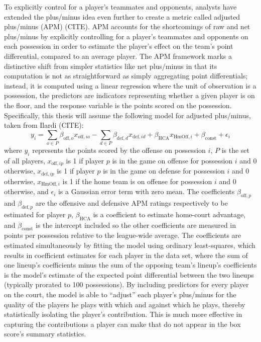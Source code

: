 To explicitly control for a player's teammates and opponents, analysts have extended
the plus/minus idea even further to create a metric called adjusted plus/minus (APM)
(CITE). APM accounts for the shortcomings of raw and net plus/minus by explicitly
controlling for a player's teammates and opponents on each possession in order to
estimate the player's effect on the team's point differential, compared to an
average player. The APM framework marks a distinctive shift from simpler statistics
like net plus/minus in that its computation is not as straightforward as simply
aggregating point differentials; instead, it is computed using a linear regression
where the unit of observation is a possession, the predictors are indicators
representing whether a given player is on the floor, and the response variable is
the points scored on the possession. Specifically, this thesis will assume the
following model for adjusted plus/minus, taken from Ilardi (CITE):
\begin{equation} \label{eq:apm}
    y_i = \sum_{o \in P} \beta_{\text{off},o} x_{\text{off},io} -
    \sum_{d \in P} \beta_{\text{def},d} x_{\text{def},id} + \beta_{\text{HCA}}
    x_{\text{HmOff},i} + \beta_{\text{const}} + \epsilon_i
\end{equation}
where $y_i$ represents the points scored by the offense on possession $i$, $P$ is
the set of all players, $x_{\text{off},ip}$ is 1 if player $p$ is in the game
on offense for possession $i$ and 0 otherwise, $x_{\text{def},ip}$ is 1 if player
$p$ is in the game on defense for possession $i$ and 0 otherwise,
$x_{\text{HmOff},i}$ is 1 if the home team is on offense for possession $i$ and 0
otherwise, and $\epsilon_i$ is a Gaussian error term with zero mean. The
coefficients $\beta_{\text{off},p}$ and $\beta_{\text{def},p}$ are the offensive and
defensive APM ratings respectively to be estimated for player $p$,
$\beta_{\text{HCA}}$ is a coefficient to estimate home-court advantage, and
$\beta_{\text{const}}$ is the intercept included so the other coefficients are
measured in points per possession relative to the league-wide average. The
coefficients are estimated simultaneously by fitting the model using ordinary
least-squares, which results in coefficient estimates for each player in the data
set, where the sum of one lineup's coefficients minus the sum of the opposing team's
lineup's coefficients is the model's estimate of the expected point differential
between the two lineups (typically prorated to 100 possessions).  By including
predictors for every player on the court, the model is able to ``adjust'' each
player's plus/minus for the quality of the players he plays with which and against
which he plays, thereby statistically isolating the player's contribution. This is
much more effective in capturing the contributions a player can make that do not
appear in the box score's summary statistics.

